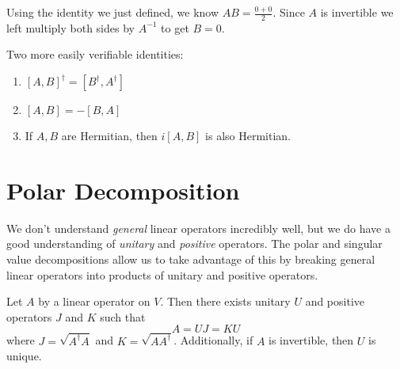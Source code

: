 \begin{lproof}
Using the identity we just defined, we know $AB = \frac{0 + 0}{2}$. Since $A$ is invertible we left multiply both sides by $A^{-1}$ to get $B = 0$. 
\end{lproof}

Two more easily verifiable identities: 
\begin{enumerate}
	\item $[A, B]^{\dagger} = [B^{\dagger}, A^{\dagger}]$
	\item $[A, B] = - [B, A]$ 
	\item If $A, B$ are Hermitian, then $i[A, B]$ is also Hermitian. 
\end{enumerate}

\section{Polar Decomposition}

We don't understand \textit{general} linear operators incredibly well, but we do have a good understanding of \textit{unitary} and \textit{positive} operators. The polar and singular value decompositions allow us to take advantage of this by breaking general linear operators into products of unitary and positive operators. 

\begin{theorem}
Let $A$ by a linear operator on $V$. Then there exists unitary $U$ and positive operators $J$ and $K$ such that 
$$A = UJ = KU$$
where $J = \sqrt{A^{\dagger}A}$ and $K = \sqrt{AA^{\dagger}}$. Additionally, if $A$ is invertible, then $U$ is unique.
\end{theorem}

